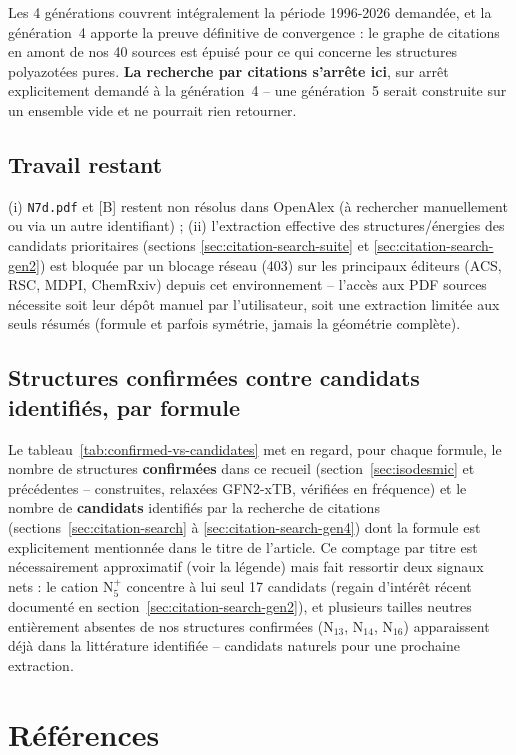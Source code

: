 \documentclass[11pt,a4paper]{article}
\begin{document}
Les 4 g\'en\'erations couvrent int\'egralement la p\'eriode 1996-2026
demand\'ee, et la g\'en\'eration~4 apporte la preuve d\'efinitive de
convergence : le graphe de citations en amont de nos 40 sources est
\'epuis\'e pour ce qui concerne les structures polyazot\'ees pures.
\textbf{La recherche par citations s'arr\^ete ici}, sur arr\^et
explicitement demand\'e \`a la g\'en\'eration~4 -- une g\'en\'eration~5
serait construite sur un ensemble vide et ne pourrait rien retourner.

\subsection{Travail restant}

(i) \texttt{N7d.pdf} et [B] restent non r\'esolus dans OpenAlex (\`a
rechercher manuellement ou via un autre identifiant) ; (ii) l'extraction
effective des structures/\'energies des candidats prioritaires (sections
\ref{sec:citation-search-suite} et \ref{sec:citation-search-gen2}) est
bloqu\'ee par un blocage r\'eseau (403) sur les principaux \'editeurs
(ACS, RSC, MDPI, ChemRxiv) depuis cet environnement -- l'acc\`es aux PDF
sources n\'ecessite soit leur d\'ep\^ot manuel par l'utilisateur, soit une
extraction limit\'ee aux seuls r\'esum\'es (formule et parfois sym\'etrie,
jamais la g\'eom\'etrie compl\`ete).

\subsection{Structures confirm\'ees contre candidats identifi\'es, par formule}
\label{sec:confirmed-vs-candidates}

Le tableau~\ref{tab:confirmed-vs-candidates} met en regard, pour chaque
formule, le nombre de structures \textbf{confirm\'ees} dans ce recueil
(section~\ref{sec:isodesmic} et pr\'ec\'edentes -- construites, relax\'ees
GFN2-xTB, v\'erifi\'ees en fr\'equence) et le nombre de \textbf{candidats}
identifi\'es par la recherche de citations
(sections~\ref{sec:citation-search} \`a \ref{sec:citation-search-gen4})
dont la formule est explicitement mentionn\'ee dans le titre de
l'article. Ce comptage par titre est n\'ecessairement approximatif (voir
la l\'egende) mais fait ressortir deux signaux nets : le cation
N$_5^{+}$ concentre \`a lui seul 17 candidats (regain d'int\'er\^et
r\'ecent document\'e en section~\ref{sec:citation-search-gen2}), et
plusieurs tailles neutres enti\`erement absentes de nos structures
confirm\'ees (N$_{13}$, N$_{14}$, N$_{16}$) apparaissent d\'ej\`a dans la
litt\'erature identifi\'ee -- candidats naturels pour une prochaine
extraction.



\section{R\'ef\'erences}


\end{document}
